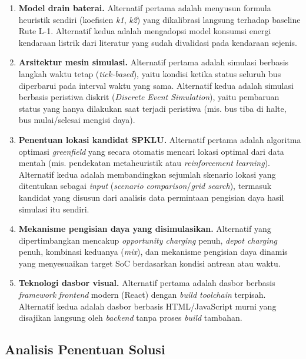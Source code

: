 \begin{enumerate}
	\item \textbf{Model drain baterai.} Alternatif pertama adalah menyusun
	formula heuristik sendiri (koefisien \textit{k1}, \textit{k2}) yang
	dikalibrasi langsung terhadap baseline Rute L-1. Alternatif kedua adalah
	mengadopsi model konsumsi energi kendaraan listrik dari literatur yang
	sudah divalidasi pada kendaraan sejenis.
	\item \textbf{Arsitektur mesin simulasi.} Alternatif pertama adalah simulasi
	berbasis langkah waktu tetap (\textit{tick-based}), yaitu kondisi ketika status seluruh
	bus diperbarui pada interval waktu yang sama. Alternatif kedua adalah
	simulasi berbasis peristiwa diskrit (\textit{Discrete Event Simulation}),
	yaitu pembaruan status yang hanya dilakukan saat terjadi peristiwa (mis. bus tiba di
	halte, bus mulai/selesai mengisi daya).
	\item \textbf{Penentuan lokasi kandidat SPKLU.} Alternatif pertama adalah
	algoritma optimasi \textit{greenfield} yang secara otomatis mencari lokasi
	optimal dari data mentah (mis. pendekatan metaheuristik atau
	\textit{reinforcement learning}). Alternatif kedua adalah membandingkan
	sejumlah skenario lokasi yang ditentukan sebagai \textit{input}
	(\textit{scenario comparison}/\textit{grid search}), termasuk kandidat
	yang disusun dari analisis data permintaan pengisian daya hasil simulasi
	itu sendiri.
	\item \textbf{Mekanisme pengisian daya yang disimulasikan.} Alternatif yang
	dipertimbangkan mencakup \textit{opportunity charging} penuh, \textit{depot
		charging} penuh, kombinasi keduanya (\textit{mix}), dan mekanisme
	pengisian daya dinamis yang menyesuaikan target SoC berdasarkan kondisi
	antrean atau waktu.
	\item \textbf{Teknologi dasbor visual.} Alternatif pertama adalah dasbor
	berbasis \textit{framework} \textit{frontend} modern (React) dengan
	\textit{build toolchain} terpisah. Alternatif kedua adalah dasbor berbasis
	HTML/JavaScript murni yang disajikan langsung oleh \textit{backend} tanpa
	proses \textit{build} tambahan.
\end{enumerate}

\subsection{Analisis Penentuan Solusi}

